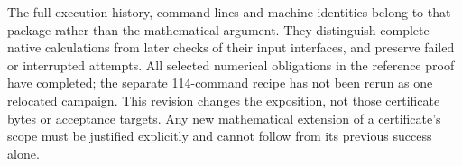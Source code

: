 The full execution history, command lines and machine identities belong
to that package rather than the mathematical argument. They distinguish
complete native calculations from later checks of their input
interfaces, and preserve failed or interrupted attempts. All selected
numerical obligations in the reference proof have completed; the
separate 114-command recipe has not been rerun as one relocated
campaign. This revision changes the exposition, not those certificate
bytes or acceptance targets. Any new mathematical extension of a
certificate's scope must be justified explicitly and cannot follow from
its previous success alone.
